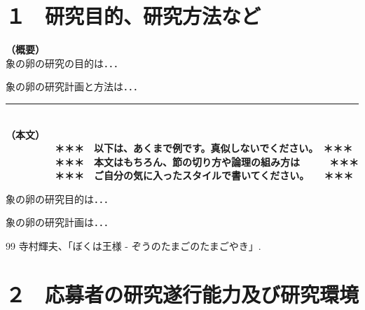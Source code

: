 \documentclass[11pt,a4j,dvipdfmx]{jarticle} 					%
\newcommand{\研究課題名}{象の卵}
\newcommand{\研究機関名}{逢坂大学}
\newcommand{\研究代表者氏名}{湯川秀樹}
\begin{document}

\section{１　研究目的、研究方法など}

\JSPSInstructions	%
\noindent
\textbf{（概要）}\\
	象の卵の研究の目的は．．．	

	象の卵の研究計画と方法は．．．
	\vspace*{10zw}	%

\noindent
\rule{\linewidth}{1pt}\\
\noindent
\textbf{（本文）}
\textbf{\\　　　　　＊＊＊　以下は、あくまで例です。真似しないでください。　＊＊＊\\
　　　　　＊＊＊　本文はもちろん、節の切り方や論理の組み方は　　　＊＊＊\\
　　　　　＊＊＊　ご自分の気に入ったスタイルで書いてください。　　＊＊＊}

	 象の卵の研究目的は．．．

	象の卵の研究計画は．．．

	\vspace{1cm}
	\begin{thebibliography}{99}
		 寺村輝夫、「ぼくは王様 - ぞうのたまごのたまごやき」.
	\end{thebibliography}




\section{２　応募者の研究遂行能力及び研究環境}
\end{document}
